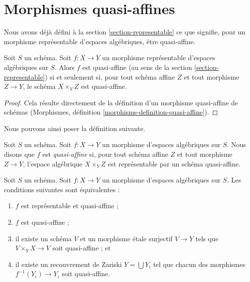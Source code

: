 \section{Morphismes quasi-affines}
\label{section-quasi-affine}

\noindent
Nous avons déjà défini à la section \ref{section-representable}
ce que signifie, pour un morphisme représentable d'espaces algébriques,
être quasi-affine.

\begin{lemma}
\label{lemma-quasi-affine-representable}
Soit $S$ un schéma. Soit $f : X \to Y$ un morphisme représentable
d'espaces algébriques sur $S$. Alors
$f$ est quasi-affine (au sens de la section \ref{section-representable})
si et seulement si, pour tout schéma affine $Z$
et tout morphisme $Z \to Y$, le schéma $X \times_Y Z$ est quasi-affine.
\end{lemma}

\begin{proof}
Cela résulte directement de la définition d'un morphisme quasi-affine
de schémas
(Morphismes, définition \ref{morphisms-definition-quasi-affine}).
\end{proof}

\noindent
Nous pouvons ainsi poser la définition suivante.

\begin{definition}
\label{definition-quasi-affine}
Soit $S$ un schéma.
Soit $f : X \to Y$ un morphisme d'espaces algébriques sur $S$.
Nous disons que $f$ est {\it quasi-affine} si, pour tout schéma affine $Z$ et tout
morphisme $Z \to Y$, l'espace algébrique $X \times_Y Z$ est représentable
par un schéma quasi-affine.
\end{definition}

\begin{lemma}
\label{lemma-quasi-affine-local}
Soit $S$ un schéma.
Soit $f : X \to Y$ un morphisme d'espaces algébriques sur $S$.
Les conditions suivantes sont équivalentes :
\begin{enumerate}
\item $f$ est représentable et quasi-affine ;
\item $f$ est quasi-affine ;
\item il existe un schéma $V$ et un morphisme étale surjectif
$V \to Y$ tels que $V \times_Y X \to V$ soit quasi-affine ; et
\item il existe un recouvrement de Zariski $Y = \bigcup Y_i$ tel
que chacun des morphismes $f^{-1}(Y_i) \to Y_i$ soit quasi-affine.
\end{enumerate}
\end{lemma}

